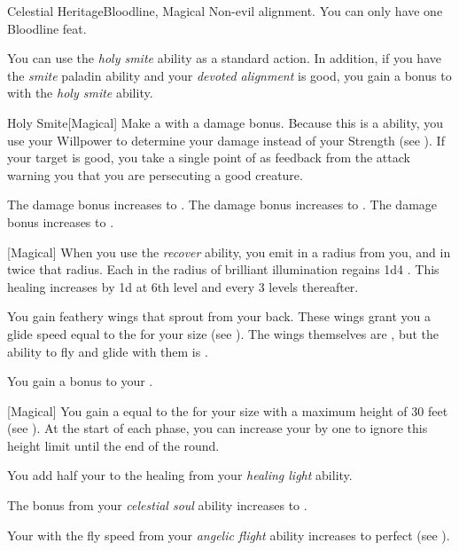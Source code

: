     \begin{feat}{Celestial Heritage}{Bloodline, Magical}
        \featpre Non-evil alignment.
         You can only have one Bloodline feat.

         You can use the \textit{holy smite} ability as a standard action.
        In addition, if you have the \textit{smite} paladin ability and your \textit{devoted alignment} is good, you gain a  bonus to  with the \textit{holy smite} ability.
        \begin{freeability}{Holy Smite}[Magical]
            Make a  with a  damage bonus.
            Because this is a  ability, you use your Willpower to determine your damage instead of your Strength (see ).
            If your target is good, you take a single point of  as feedback from the attack warning you that you are persecuting a good creature.

            \rankline
             The damage bonus increases to .
             The damage bonus increases to .
             The damage bonus increases to .
        \end{freeability}

        [Magical] When you use the \textit{recover} ability, you  emit  in a \medarea radius from you, and  in twice that radius.
        Each  in the radius of brilliant illumination regains 1d4 .
        This healing increases by \plus1d at 6th level and every 3 levels thereafter.

         You gain feathery wings that sprout from your back.
        These wings grant you a glide speed equal to the  for your size (see ).
        The wings themselves are , but the ability to fly and glide with them is .

         You gain a  bonus to your .

        [Magical] You gain a  equal to the  for your size with a maximum height of 30 feet (see ).
        At the start of each phase, you can increase your  by one to ignore this height limit until the end of the round.

         You add half your  to the healing from your \textit{healing light} ability.

         The bonus from your \textit{celestial soul} ability increases to .

         Your  with the fly speed from your \textit{angelic flight} ability increases to perfect (see ).
    \end{feat}

